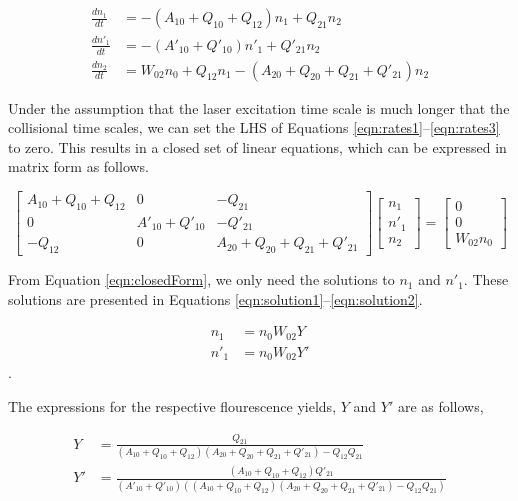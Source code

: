 \begin{align}
  \frac{dn_1}{dt} &= -( A_{10} + Q_{10} + Q_{12} )n_1 + Q_{21} n_2
  \label{eqn:rates1}\\
  \frac{dn'_1}{dt} &= -( A'_{10} + Q'_{10} )n'_1 + Q'_{21} n_2
  \label{eqn:rates2}\\
  \frac{dn_2}{dt} &= W_{02} n_0 + Q_{12} n_1 - ( A_{20} + Q_{20} + Q_{21} + Q'_{21} )n_2
  \label{eqn:rates3}
\end{align}

Under the assumption that the laser excitation time scale is much longer that the collisional time scales, we can set the LHS of Equations \ref{eqn:rates1}--\ref{eqn:rates3} to zero.
This results in a closed set of linear equations, which can be expressed in matrix form as follows.

\begin{equation}
  \left[
    \begin{matrix}
      A_{10} + Q_{10} + Q_{12} & 0 & -Q_{21}\\
      0 & A'_{10} + Q'_{10} & -Q'_{21}\\
      -Q_{12} & 0 & A_{20} + Q_{20} + Q_{21} + Q'_{21}
    \end{matrix}
  \right]\left[
    \begin{matrix}
      n_1\\
      n'_1\\
      n_2
    \end{matrix}
  \right] = \left[
    \begin{matrix}
      0\\
      0\\
      W_{02}n_0
    \end{matrix}
  \right]
  \label{eqn:closedForm}
\end{equation}

From Equation \ref{eqn:closedForm}, we only need the solutions to \(n_1\) and \(n'_1\).
These solutions are presented in Equations \ref{eqn:solution1}--\ref{eqn:solution2}.

\begin{align}
  n_1 &= n_0W_{02}Y
  \label{eqn:solution1}\\
  n'_1 &= n_0W_{02}Y'
  \label{eqn:solution2}
\end{align}.

The expressions for the respective flourescence yields, \(Y\) and \(Y'\) are as follows,

\begin{align}
  Y &= \frac{ Q_{21} }{ ( A_{10} + Q_{10} + Q_{12} )( A_{20} + Q_{20} + Q_{21} + Q'_{21} ) - Q_{12}Q_{21} }
  \label{eqn:flourescenceYield1-unsimplified}\\
  Y' &= \frac{ ( A_{10} + Q_{10} + Q_{12} )Q'_{21} }{ ( A'_{10} + Q'_{10} ) ( ( A_{10} + Q_{10} + Q_{12} )( A_{20} + Q_{20} + Q_{21} + Q'_{21} ) - Q_{12}Q_{21} ) }
  \label{eqn:fluorescenceYield2-unsimplified}
\end{align}


